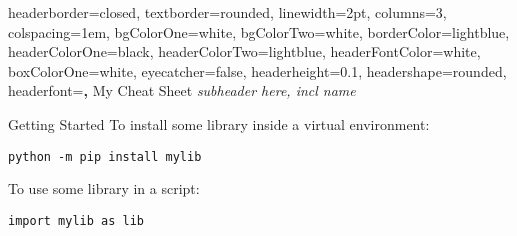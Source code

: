 \documentclass[portrait,a0paper]{baposter} %
\begin{document}
\begin{poster}
{   
headerborder=closed, %
textborder=rounded, %
linewidth=2pt, %
columns=3,
colspacing=1em, %
bgColorOne=white, %
bgColorTwo=white, %
borderColor=lightblue, %
headerColorOne=black, %
headerColorTwo=lightblue, %
headerFontColor=white, %
boxColorOne=white, %
eyecatcher=false, %
headerheight=0.1\textheight, %
headershape=rounded, %
headerfont=\Large\bf\textsc, %
}
{   
}
{
My Cheat Sheet
}
{
\textit{subheader here, incl name}
}
{
}
\begin{posterbox}[name=box0,column=0,row=0]{Getting Started}
To install some library inside a virtual environment:
\begin{verbatim}
python -m pip install mylib
\end{verbatim}

To use some library in a script:
\begin{verbatim}
import mylib as lib
\end{verbatim}
\end{posterbox}


\end{poster}
\end{document}
